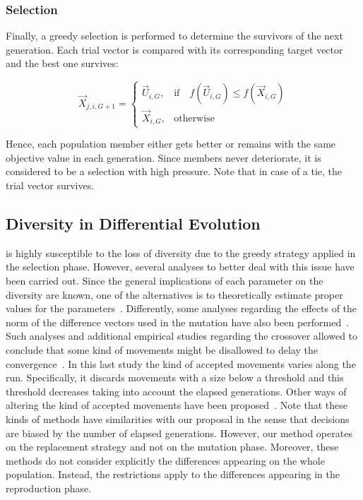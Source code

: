 \subsubsection{Selection}
Finally, a greedy selection is performed to determine the survivors of the next generation.
%
Each trial vector is compared with its corresponding target vector and the best one survives:

\begin{equation} \label{eqn:selection}
\vec{X}_{j,i,G+1}= 
\begin{cases}
    \vec{U}_{i,G},& \text{if} \quad f(\vec{U}_{i,G}) \leq f(\vec{X}_{i,G})  \\
    \vec{X}_{i,G},              & \text{otherwise}
\end{cases}
\end{equation}

Hence, each population member either gets better or remains with the same objective value in each generation.
%
Since members never deteriorate, it is considered to be a selection with high pressure.
%
Note that in case of a tie, the trial vector survives.

%

\subsection{Diversity in Differential Evolution}

\DE{} is highly susceptible to the loss of diversity due to the greedy strategy applied in the selection phase.
%
However, several analyses to better deal with this issue have been carried out.
%
Since the general implications of each parameter on the diversity are known, one of
the alternatives is to theoretically estimate proper values for the \DE{} parameters~\cite{zaharie2003control}.
%
Differently, some analyses regarding the effects of the norm of the difference vectors used in the mutation
have also been performed~\cite{montgomery2009differential}.
%
Such analyses and additional empirical studies regarding the crossover allowed to conclude that some kind of movements 
might be disallowed to delay the convergence~\cite{montgomery2012simple}.
%
In this last study the kind of accepted movements varies along the run.
%
Specifically, it discards movements with a size below a threshold and this threshold decreases taking into account the elapsed generations.
%
Other ways of altering the kind of accepted movements have been proposed~\cite{bolufe2013differential}.
%
Note that these kinds of methods have similarities with our proposal in the sense that decisions are biased by the number of elapsed generations.
%
However, our method operates on the replacement strategy and not on the mutation phase.
%
Moreover, these methods do not consider explicitly the differences appearing on the whole population.
%
Instead, the restrictions apply to the differences appearing in the reproduction phase.

